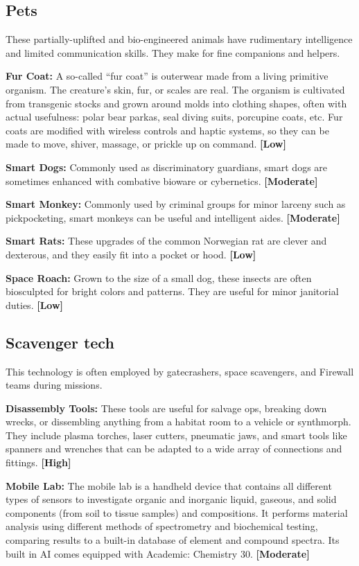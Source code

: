 \subsection{Pets} \label{sec:pets} 

These partially-uplifted and bio-engineered animals have rudimentary intelligence and limited communication skills. They make for fine companions and helpers. 

\textbf{Fur Coat:} A so-called ``fur coat'' is outerwear made from a living primitive organism. The creature’s skin, fur, or scales are real. The organism is cultivated from transgenic stocks and grown around molds into clothing shapes, often with actual usefulness: polar bear parkas, seal diving suits, porcupine coats, etc. Fur coats are modified with wireless controls and haptic systems, so they can be made to move, shiver, massage, or prickle up on command. \textbf{[Low]} 

\textbf{Smart Dogs:} Commonly used as discriminatory guardians, smart dogs are sometimes enhanced with combative bioware or cybernetics. \textbf{[Moderate]} 

\textbf{Smart Monkey:} Commonly used by criminal groups for minor larceny such as pickpocketing, smart monkeys can be useful and intelligent aides. \textbf{[Moderate]} 

\textbf{Smart Rats:} These upgrades of the common Norwegian rat are clever and dexterous, and they easily fit into a pocket or hood. \textbf{[Low]} 

\textbf{Space Roach:} Grown to the size of a small dog, these insects are often biosculpted for bright colors and patterns. They are useful for minor janitorial duties. \textbf{[Low]} 

\subsection{Scavenger tech} \label{sec:scavenger-tech} 

This technology is often employed by gatecrashers, space scavengers, and Firewall teams during missions. 

\textbf{Disassembly Tools:} These tools are useful for salvage ops, breaking down wrecks, or dissembling anything from a habitat room to a vehicle or synthmorph. They include plasma torches, laser cutters, pneumatic jaws, and smart tools like spanners and wrenches that can be adapted to a wide array of connections and fittings. \textbf{[High]} 

\textbf{Mobile Lab:} The mobile lab is a handheld device that contains all different types of sensors to investigate organic and inorganic liquid, gaseous, and solid components (from soil to tissue samples) and compositions. It performs material analysis using different methods of spectrometry and biochemical testing, comparing results to a built-in database of element and compound spectra. Its built in AI comes equipped with Academic: Chemistry 30. \textbf{[Moderate]} 

